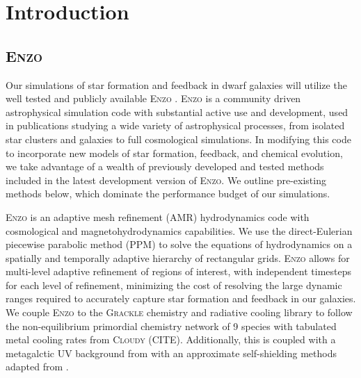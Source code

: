 \documentclass[11pt]{article}
\begin{document}
\maketitle

\section{Introduction}

\subsection{\textsc{Enzo}}

Our simulations of star formation and feedback in dwarf galaxies will utilize the well tested and publicly available \textsc{Enzo} \citep{Enzo-method}. \textsc{Enzo} is a community driven astrophysical simulation code with substantial active use and development, used in publications studying a wide variety of astrophysical processes, from isolated star clusters and galaxies to full cosmological simulations. In modifying this code to incorporate new models of star formation, feedback, and chemical evolution, we take advantage of a wealth of previously developed and tested methods included in the latest development version of \textsc{Enzo}. We outline pre-existing methods below, which dominate the performance budget of our simulations. 

\textsc{Enzo} is an adaptive mesh refinement (AMR) hydrodynamics code with cosmological and magnetohydrodynamics capabilities. We use the direct-Eulerian piecewise parabolic method (PPM) \citep{ColellaWoodward1984, Bryan1995} to solve the equations of hydrodynamics on a spatially and temporally adaptive hierarchy of rectangular grids. \textsc{Enzo} allows for multi-level adaptive refinement of regions of interest, with independent timesteps for each level of refinement, minimizing the cost of resolving the large dynamic ranges required to accurately capture star formation and feedback in our galaxies. We couple \textsc{Enzo} to the \textsc{Grackle} chemistry and radiative cooling library to follow the non-equilibrium primordial chemistry network of 9 species with tabulated metal cooling rates from \textsc{Cloudy} (CITE). Additionally, this is coupled with a metagalctic UV background from \cite{HM2012} with an approximate self-shielding methods adapted from \cite{XX}.  
\end{document}
